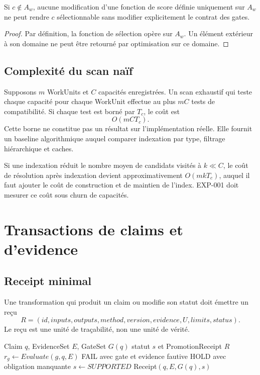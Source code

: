 \begin{proposition}
Si $c\notin A_w$, aucune modification d'une fonction de score définie uniquement sur $A_w$ ne peut rendre $c$ sélectionnable sans modifier explicitement le contrat des gates.
\end{proposition}

\begin{proof}
Par définition, la fonction de sélection opère sur $A_w$. Un élément extérieur à son domaine ne peut être retourné par optimisation sur ce domaine.
\end{proof}

\section{Complexité du scan naïf}

Supposons $m$ WorkUnits et $C$ capacités enregistrées. Un scan exhaustif qui teste chaque capacité pour chaque WorkUnit effectue au plus $mC$ tests de compatibilité. Si chaque test est borné par $T_c$, le coût est
\[
O(mCT_c).
\]
Cette borne ne constitue pas un résultat sur l'implémentation réelle. Elle fournit un baseline algorithmique auquel comparer indexation par type, filtrage hiérarchique et caches.

Si une indexation réduit le nombre moyen de candidats visités à $k\ll C$, le coût de résolution après indexation devient approximativement $O(mkT_c)$, auquel il faut ajouter le coût de construction et de maintien de l'index. EXP-001 doit mesurer ce coût sous churn de capacités.

\chapter{Transactions de claims et d'evidence}

\section{Receipt minimal}

Une transformation qui produit un claim ou modifie son statut doit émettre un reçu
\[
R=(id,inputs,outputs,method,version,evidence,U,limits,status).
\]
Le reçu est une unité de traçabilité, non une unité de vérité.

\begin{algorithm}
\caption{Promotion locale d'un claim}
\begin{algorithmic}[1]
\Require Claim $q$, EvidenceSet $E$, GateSet $G(q)$
\Ensure statut $s$ et PromotionReceipt $R$
  \State $r_g\gets Evaluate(g,q,E)$
    \State \Return FAIL avec gate et evidence fautive
    \State \Return HOLD avec obligation manquante
  \EndIf
\EndFor
\State $s\gets SUPPORTED$
\State \Return Receipt$(q,E,G(q),s)$
\end{algorithmic}
\end{algorithm}


